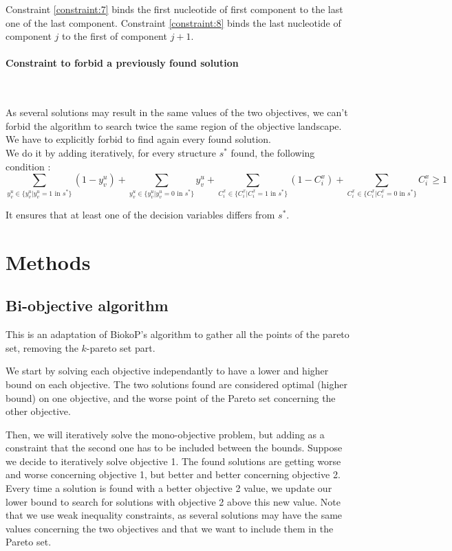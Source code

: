 \documentclass{article}
\begin{document}
Constraint \ref{constraint:7} binds the first nucleotide of first component to the last one of the last component. 
Constraint \ref{constraint:8} binds the last nucleotide of component $j$ to the first of component $j+1$.

\paragraph{Constraint to forbid a previously found solution} ~ 

As several solutions may result in the same values of the two objectives, we can't forbid the algorithm to search twice the same region of the objective landscape.
We have to explicitly forbid to find again every found solution.\\
We do it by adding iteratively, for every structure $s^*$ found, the following condition :
\begin{equation}\label{constraint:9}
	\sum_{y^u_v \in \{ y^u_v  | y^u_v = 1 \text{ in } s^* \}} (1 - y^u_v) + \sum_{y^u_v \in \{ y^u_v  | y^u_v = 0 \text{ in } s^* \}} y^u_v +
	\sum_{C^x_i \in \{ C^x_i  | C^x_i = 1 \text{ in } s^* \}} (1 - C^x_i) + \sum_{C^x_i \in \{ C^x_i  |C^x_i = 0 \text{ in } s^* \}} C^x_i \geq 1
\end{equation}

It ensures that at least one of the decision variables differs from $s^*$.

\section{Methods \label{methods}}
\subsection{Bi-objective algorithm}
This is an adaptation of BiokoP's algorithm \cite{legendre_bi-objective_2018} to gather all the points of the pareto set, removing the $k$-pareto set part.

We start by solving each objective independantly to have a lower and higher bound on each objective. 
The two solutions found are considered optimal (higher bound) on one objective, and the worse point of the Pareto set concerning the other objective.

Then, we will iteratively solve the mono-objective problem, but adding as a constraint that the second one has to be included between the bounds.
Suppose we decide to iteratively solve objective 1. 
The found solutions are getting worse and worse concerning objective 1, but better and better concerning objective 2. 
Every time a solution is found with a better objective 2 value, we update our lower bound to search for solutions with objective 2 above this new value.
Note that we use weak inequality constraints, as several solutions may have the same values concerning the two objectives and that we want to include them in the Pareto set.
\end{document}
